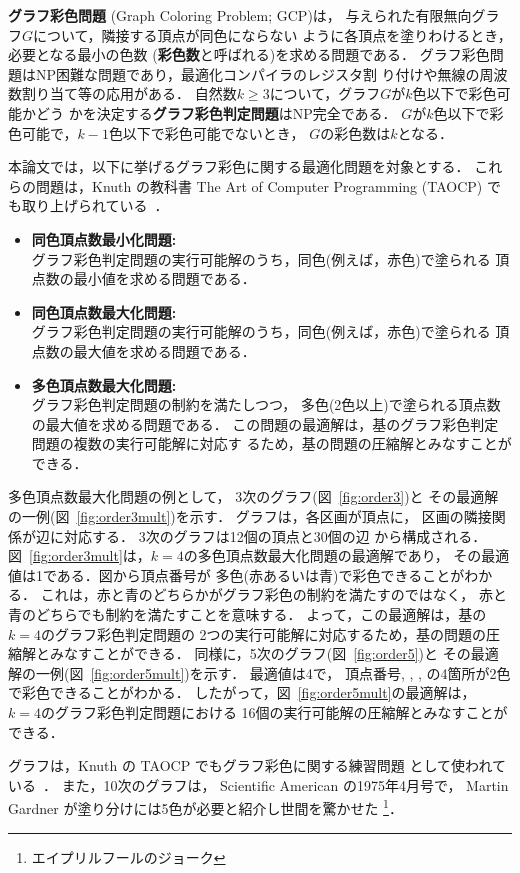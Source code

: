 \textbf{グラフ彩色問題} (Graph Coloring Problem; GCP)は，
与えられた有限無向グラフ$G$について，隣接する頂点が同色にならない
ように各頂点を塗りわけるとき，必要となる最小の色数
(\textbf{彩色数}と呼ばれる)を求める問題である．
グラフ彩色問題はNP困難な問題であり，最適化コンパイラのレジスタ割
り付けや無線の周波数割り当て等の応用がある．
自然数$k\geq 3$について，グラフ$G$が$k$色以下で彩色可能かどう
かを決定する\textbf{グラフ彩色判定問題}はNP完全である．
$G$が$k$色以下で彩色可能で，$k-1$色以下で彩色可能でないとき，
$G$の彩色数は$k$となる．

本論文では，以下に挙げるグラフ彩色に関する最適化問題を対象とする．
これらの問題は，Knuth の教科書 The Art of Computer Programming (TAOCP)
でも取り上げられている~\cite{Knuth:TAOCP:SAT}．

\begin{itemize}
\item \textbf{同色頂点数最小化問題: }\\
  グラフ彩色判定問題の実行可能解のうち，同色(例えば，赤色)で塗られる
  頂点数の最小値を求める問題である．
\item \textbf{同色頂点数最大化問題: }\\
  グラフ彩色判定問題の実行可能解のうち，同色(例えば，赤色)で塗られる
  頂点数の最大値を求める問題である．
\item \textbf{多色頂点数最大化問題: }\\
  グラフ彩色判定問題の制約を満たしつつ，
  多色(2色以上)で塗られる頂点数の最大値を求める問題である．
  この問題の最適解は，基のグラフ彩色判定問題の複数の実行可能解に対応す
  るため，基の問題の圧縮解とみなすことができる．
\end{itemize}

多色頂点数最大化問題の例として，
3次のグラフ(図~\ref{fig:order3})と
その最適解の一例(図~\ref{fig:order3mult})を示す．
グラフは，各区画が頂点に，
区画の隣接関係が辺に対応する．
3次のグラフは12個の頂点と30個の辺
から構成される．
図~\ref{fig:order3mult}は，$k=4$の多色頂点数最大化問題の最適解であり，
その最適値は1である．図から頂点番号が
多色(赤あるいは青)で彩色できることがわかる．
これは，赤と青のどちらかがグラフ彩色の制約を満たすのではなく，
赤と青のどちらでも制約を満たすことを意味する．
よって，この最適解は，基の$k=4$のグラフ彩色判定問題の
2つの実行可能解に対応するため，基の問題の圧縮解とみなすことができる．
%
同様に，5次のグラフ(図~\ref{fig:order5})と
その最適解の一例(図~\ref{fig:order5mult})を示す．
最適値は4で，
頂点番号, , , 
の4箇所が2色で彩色できることがわかる．
したがって，図~\ref{fig:order5mult}の最適解は，
$k=4$のグラフ彩色判定問題における
16個の実行可能解の圧縮解とみなすことができる．

グラフは，Knuth の TAOCP でもグラフ彩色に関する練習問題
として使われている~\cite{Knuth:TAOCP:SAT}．
また，10次のグラフは，
Scientific American の1975年4月号で，
Martin Gardner が塗り分けには5色が必要と紹介し世間を驚かせた
\footnote{エイプリルフールのジョーク}．

